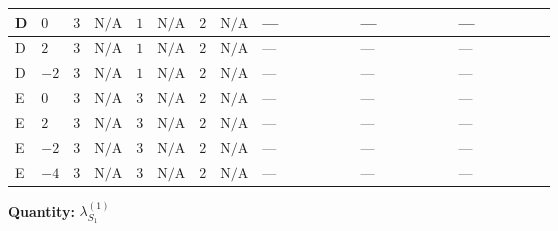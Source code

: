 \documentclass[8pt]{article}
\begin{document}
\begin{landscape}
\begin{longtable}{@{}llcccccc >{\raggedright\arraybackslash}p{0.21\linewidth} >{\raggedright\arraybackslash}p{0.21\linewidth} >{\raggedright\arraybackslash}p{0.21\linewidth}@{}}
\midrule
D & $0$ & $3$ & $\text{N/A}$ & $1$ & $\text{N/A}$ & $2$ & $\text{N/A}$ & --- & --- & --- \\
\midrule
D & $2$ & $3$ & $\text{N/A}$ & $1$ & $\text{N/A}$ & $2$ & $\text{N/A}$ & --- & --- & --- \\
\midrule
D & $-2$ & $3$ & $\text{N/A}$ & $1$ & $\text{N/A}$ & $2$ & $\text{N/A}$ & --- & --- & --- \\
\midrule
E & $0$ & $3$ & $\text{N/A}$ & $3$ & $\text{N/A}$ & $2$ & $\text{N/A}$ & --- & --- & --- \\
\midrule
E & $2$ & $3$ & $\text{N/A}$ & $3$ & $\text{N/A}$ & $2$ & $\text{N/A}$ & --- & --- & --- \\
\midrule
E & $-2$ & $3$ & $\text{N/A}$ & $3$ & $\text{N/A}$ & $2$ & $\text{N/A}$ & --- & --- & --- \\
\midrule
E & $-4$ & $3$ & $\text{N/A}$ & $3$ & $\text{N/A}$ & $2$ & $\text{N/A}$ & --- & --- & --- \\
\midrule
\bottomrule
\end{longtable}
\clearpage
\noindent\textbf{Quantity: }$\lambda_{S_1}^{(1)}$\par\smallskip

\end{landscape}
\end{document}
